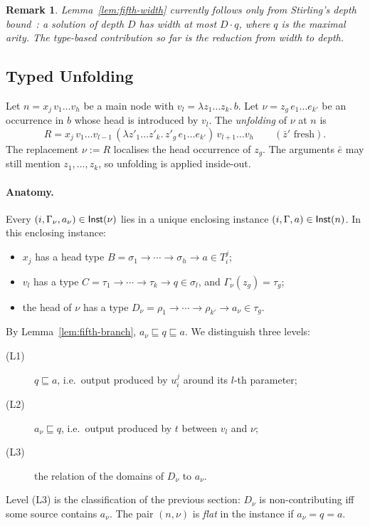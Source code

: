 \documentclass[10pt,a4paper]{article}
\theoremstyle{plain}%
\newtheorem{remark}[theorem]{Remark}
\begin{document}
\begin{remark}
Lemma~\ref{lem:fifth-width} currently follows only from Stirling's depth bound~\cite{stirling2009}: a solution of depth $D$ has width at most $D \cdot q$, where $q$ is the maximal arity.
The type-based contribution so far is the reduction from width to depth.
\end{remark}

\subsection{Typed Unfolding}
\label{sec:fifth-unfold}

Let $n = x_j\,v_1\ldots v_h$ be a main node with $v_l = \lambda z_1\ldots z_k.\,b$.
Let $\nu = z_g\,e_1\ldots e_{k'}$ be an occurrence in $b$ whose head is introduced by $v_l$.
The \emph{unfolding} of $\nu$ at $n$ is
\[
R = x_j\,v_1\ldots v_{l-1}\,(\lambda z'_1\ldots z'_k.\,z'_g\,e_1\ldots e_{k'})\,v_{l+1}\ldots v_h
\qquad (\bar z' \text{ fresh}).
\]
The replacement $\nu := R$ localises the head occurrence of $z_g$.
The arguments $\bar e$ may still mention $z_1, \ldots, z_k$, so unfolding is applied inside-out.

\paragraph{Anatomy.}
Every $(i,\Gamma_\nu,a_\nu) \in \mathsf{Inst}(\nu)$ lies in a unique enclosing instance $(i,\Gamma,a) \in \mathsf{Inst}(n)$.
In this enclosing instance:
\begin{itemize}
\item $x_j$ has a head type $B = \sigma_1 \to \cdots \to \sigma_h \to a \in T_i^j$;
\item $v_l$ has a type $C = \tau_1 \to \cdots \to \tau_k \to q \in \sigma_l$, and $\Gamma_\nu(z_g) = \tau_g$;
\item the head of $\nu$ has a type $D_\nu = \rho_1 \to \cdots \to \rho_{k'} \to a_\nu \in \tau_g$.
\end{itemize}
By Lemma~\ref{lem:fifth-branch}, $a_\nu \sqsubseteq q \sqsubseteq a$.
We distinguish three levels:
\begin{description}
\item[(L1)] $q \sqsubseteq a$, i.e.\ output produced by $u_i^j$ around its $l$-th parameter;
\item[(L2)] $a_\nu \sqsubseteq q$, i.e.\ output produced by $t$ between $v_l$ and $\nu$;
\item[(L3)] the relation of the domains of $D_\nu$ to $a_\nu$.
\end{description}
Level (L3) is the classification of the previous section: $D_\nu$ is non-contributing iff some source contains $a_\nu$.
The pair $(n,\nu)$ is \emph{flat} in the instance if $a_\nu = q = a$.
\end{document}
